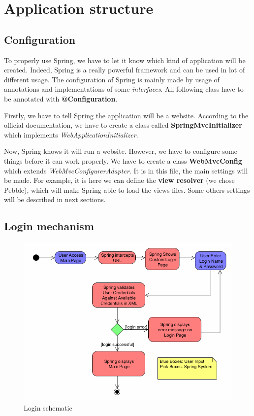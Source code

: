 \section{Application structure}

\subsection{Configuration}
To properly use Spring, we have to let it know which kind of application will be created. Indeed, Spring is a really powerful framework and can be used in lot of different usage.
The configuration of Spring is mainly made by usage of annotations and implementations of some \textit{interfaces}. All following class have to be annotated with \textbf{@Configuration}.\newline

Firstly, we have to tell Spring the application will be a website. According to the official documentation, we have to create a class called \textbf{SpringMvcInitializer} which implements \textit{WebApplicationInitializer}.\newline

Now, Spring knows it will run a website. However, we have to configure some things before it can work properly. We have to create a class \textbf{WebMvcConfig} which extends \textit{WebMvcConfigurerAdapter}. It is in this file, the main settings will be made. For example, it is here we can define the \textbf{view resolver} (we chose Pebble), which will make Spring able to load the views files.  Some others settings will be described in next sections.
\newline


\subsection{Login mechanism}

\begin{figure}[H]
  \caption{Login schematic}
  \centering
    \includegraphics[width=1\textwidth]{img/login.png}
\end{figure}


